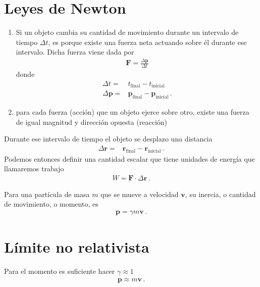 \documentclass[11pt,a4paper]{article}
\begin{document}
\section{Leyes de Newton}
\begin{enumerate}
    \item Si un objeto cambia su  cantidad de movimiento durante un intervalo de tiempo $\Delta t$, es porque existe una fuerza neta actuando sobre él durante ese intervalo.  Dicha fuerza viene dada por
    \begin{align}
        \boldsymbol{F} = \frac{\Delta \boldsymbol{p}}{\Delta t}
    \end{align}
    donde
    \begin{align}
    \Delta t =& t_{\text{final}}-t_{\text{inicial}}\\
    \Delta\boldsymbol{p} =& \boldsymbol{p}_{\text{final}}
    - \boldsymbol{p}_{\text{inicial}}\,.    
    \end{align}

\item  para cada fuerza (acción) que un objeto ejerce sobre otro, existe una fuerza de igual magnitud y dirección opuesta (reacción)
\end{enumerate}

Durante ese intervalo de tiempo el objeto se desplazo una distancia
\begin{align}
    \Delta\boldsymbol{r} =& \boldsymbol{r}_{\text{final}}
    - \boldsymbol{r}_{\text{inicial}}\,.      
\end{align}
Podemos entonces definir una cantidad escalar que tiene unidades de energía que llamaremos trabajo
\begin{align}
    W = \boldsymbol{F}\cdot \Delta\boldsymbol{r}\,.
\end{align}




Para una partícula de masa $m$ que se mueve a velocidad $\boldsymbol{v}$, su inercia, o cantidad de movimiento, o momento, es
\begin{align}
    \boldsymbol{p} = \gamma m \boldsymbol{v}\,.
\end{align}





\section{Límite no relativista}

Para el momento es suficiente hacer $\gamma \approx 1$
\begin{align}
    \boldsymbol{p} \approx m \boldsymbol{v}\,.
\end{align}
\end{document}
